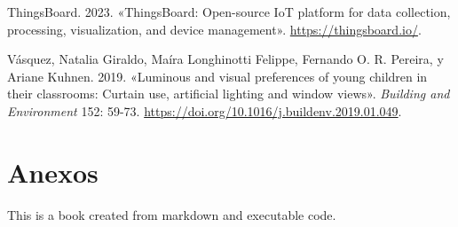\documentclass[
  letterpaper,
]{scrbook}
\newlength{\cslhangindent}
\newenvironment{CSLReferences}[2] %
 {\begin{list}{}{%
  \setlength{\itemindent}{0pt}
  \setlength{\leftmargin}{0pt}
  \setlength{\parsep}{0pt}
  \ifodd #1
   \setlength{\leftmargin}{\cslhangindent}
   \setlength{\itemindent}{-1\cslhangindent}
  \fi
  \setlength{\itemsep}{#2\baselineskip}}}
 {\end{list}}
\begin{document}
\begin{CSLReferences}{1}{0}
ThingsBoard. 2023. {«ThingsBoard: Open-source IoT platform for data
collection, processing, visualization, and device management»}.
\url{https://thingsboard.io/}.

Vásquez, Natalia Giraldo, Maíra Longhinotti Felippe, Fernando O. R.
Pereira, y Ariane Kuhnen. 2019. {«Luminous and visual preferences of
young children in their classrooms: Curtain use, artificial lighting and
window views»}. \emph{Building and Environment} 152: 59-73.
\url{https://doi.org/10.1016/j.buildenv.2019.01.049}.

\end{CSLReferences}


\chapter*{Anexos}\label{anexos}


This is a book created from markdown and executable code.


\backmatter
\end{document}
